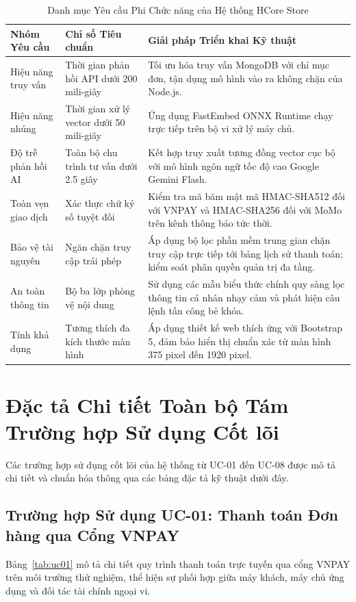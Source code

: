\begin{table}[H]
\centering
\caption{Danh mục Yêu cầu Phi Chức năng của Hệ thống HCore Store}
\label{tab:nfr}
\begin{tabularx}{\textwidth}{p{3cm}p{4cm}X}
\toprule
\textbf{Nhóm Yêu cầu} & \textbf{Chỉ số Tiêu chuẩn} & \textbf{Giải pháp Triển khai Kỹ thuật} \\
\midrule
Hiệu năng truy vấn & Thời gian phản hồi API dưới 200 mili-giây & Tối ưu hóa truy vấn MongoDB với chỉ mục đơn, tận dụng mô hình vào ra không chặn của Node.js. \\
\addlinespace
Hiệu năng nhúng & Thời gian xử lý vector dưới 50 mili-giây & Ứng dụng FastEmbed ONNX Runtime chạy trực tiếp trên bộ vi xử lý máy chủ. \\
\addlinespace
Độ trễ phản hồi AI & Toàn bộ chu trình tư vấn dưới 2.5 giây & Kết hợp truy xuất tương đồng vector cục bộ với mô hình ngôn ngữ tốc độ cao Google Gemini Flash. \\
\addlinespace
Toàn vẹn giao dịch & Xác thực chữ ký số tuyệt đối & Kiểm tra mã băm mật mã HMAC-SHA512 đối với VNPAY và HMAC-SHA256 đối với MoMo trên kênh thông báo tức thời. \\
\addlinespace
Bảo vệ tài nguyên & Ngăn chặn truy cập trái phép & Áp dụng bộ lọc phần mềm trung gian chặn truy cập trực tiếp tới bảng lịch sử thanh toán; kiểm soát phân quyền quản trị đa tầng. \\
\addlinespace
An toàn thông tin & Bộ ba lớp phòng vệ nội dung & Sử dụng các mẫu biểu thức chính quy sàng lọc thông tin cá nhân nhạy cảm và phát hiện câu lệnh tấn công bẻ khóa. \\
\addlinespace
Tính khả dụng & Tương thích đa kích thước màn hình & Áp dụng thiết kế web thích ứng với Bootstrap 5, đảm bảo hiển thị chuẩn xác từ màn hình 375 pixel đến 1920 pixel. \\
\bottomrule
\end{tabularx}
\end{table}

\section{Đặc tả Chi tiết Toàn bộ Tám Trường hợp Sử dụng Cốt lõi}
Các trường hợp sử dụng cốt lõi của hệ thống từ UC-01 đến UC-08 được mô tả chi tiết và chuẩn hóa thông qua các bảng đặc tả kỹ thuật dưới đây.

\subsection{Trường hợp Sử dụng UC-01: Thanh toán Đơn hàng qua Cổng VNPAY}
Bảng~\ref{tab:uc01} mô tả chi tiết quy trình thanh toán trực tuyến qua cổng VNPAY trên môi trường thử nghiệm, thể hiện sự phối hợp giữa máy khách, máy chủ ứng dụng và đối tác tài chính ngoại vi.

